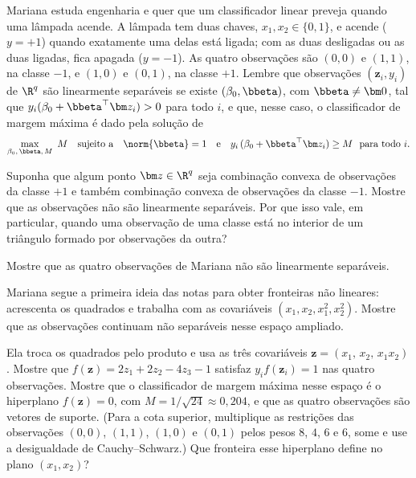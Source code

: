 Mariana estuda engenharia e quer que um classificador linear preveja quando uma lâmpada
acende. A lâmpada tem duas chaves, $x_1,x_2\in\{0,1\}$, e acende ($y=+1$) quando exatamente
uma delas está ligada; com as duas desligadas ou as duas ligadas, fica apagada ($y=-1$). As
quatro observações são $(0,0)$ e $(1,1)$, na classe $-1$, e $(1,0)$ e $(0,1)$, na classe
$+1$. Lembre que observações $(\bm z_i,y_i)$ de $\R^q$ são linearmente separáveis se existe
$(\beta_0,\bbeta)$, com $\bbeta\ne\bm0$, tal que $y_i(\beta_0+\bbeta^\top\bm z_i)>0$ para todo
$i$, e que, nesse caso, o classificador de margem máxima é dado pela solução de
\[
  \max_{\beta_0,\,\bbeta,\,M}\ M
  \quad\text{sujeito a}\quad
  \norm{\bbeta}=1
  \quad\text{e}\quad
  y_i\,(\beta_0+\bbeta^\top\bm z_i)\ge M\ \text{ para todo } i .
\]
\begin{itens}
  \item {} Suponha que algum ponto $\bm z\in\R^q$ seja combinação convexa de
        observações da classe $+1$ e também combinação convexa de observações da classe
        $-1$. Mostre que as observações não são linearmente separáveis. Por que isso vale,
        em particular, quando uma observação de uma classe está no interior de um triângulo
        formado por observações da outra?
  \item {} Mostre que as quatro observações de Mariana não são linearmente separáveis.
  \item {} Mariana segue a primeira ideia das notas para obter fronteiras não lineares:
        acrescenta os quadrados e trabalha com as covariáveis $(x_1,x_2,x_1^2,x_2^2)$. Mostre
        que as observações continuam não separáveis nesse espaço ampliado.
  \item {} Ela troca os quadrados pelo produto e usa as três covariáveis
        $\bm z=(x_1,\,x_2,\,x_1x_2)$. Mostre que $f(\bm z)=2z_1+2z_2-4z_3-1$ satisfaz
        $y_if(\bm z_i)=1$ nas quatro observações. Mostre que o classificador de margem
        máxima nesse espaço é o hiperplano $f(\bm z)=0$, com $M=1/\sqrt{24}\approx0{,}204$,
        e que as quatro observações são vetores de suporte. (Para a cota superior, multiplique
        as restrições das observações $(0,0)$, $(1,1)$, $(1,0)$ e $(0,1)$ pelos pesos $8$,
        $4$, $6$ e $6$, some e use a desigualdade de Cauchy--Schwarz.) Que fronteira esse
        hiperplano define no plano $(x_1,x_2)$?
\end{itens}

